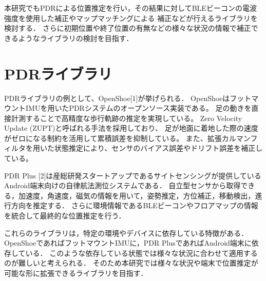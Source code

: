 本研究でもPDRによる位置推定を行い，その結果に対してBLEビーコンの電波強度を使用した補正やマップマッチングによる
補正などが行えるライブラリを検討する．
さらに初期位置や終了位置の有無などの様々な状況の情報で補正できるようなライブラリの検討を目指す．



\section{PDRライブラリ}
PDRライブラリの例として、OpenShoe[1]が挙げられる．
OpenShoeはフットマウントIMUを用いたPDRシステムのオープンソース実装である。
足の動きを直接計測することで高精度な歩行軌跡の推定を実現している。
Zero Velocity Update (ZUPT)と呼ばれる手法を採用しており、
足が地面に着地した際の速度がゼロになる制約を活用して累積誤差を抑制している。
また、拡張カルマンフィルタを用いた状態推定により、センサのバイアス誤差やドリフト誤差を補正している。

PDR Plus [2]は産総研発スタートアップであるサイトセンシングが提供しているAndroid端末向けの自律航法測位システムである．
自立型センサから取得できる，加速度，角速度，磁気の情報を用いて，姿勢推定，方位補正，移動検出，進行方向を推定する．
さらに環境情報であるBLEビーコンやフロアマップの情報を統合して最終的な位置推定を行う．

これらのライブラリは，特定の環境やデバイスに依存している特徴がある．
OpenShoeであればフットマウントIMUに，PDR PlusであればAndroid端末に依存している．
このような依存している状態では様々な状況に合わせて適用するのが難しいと考えられる．
そのため本研究では様々な状況や端末で位置推定が可能な形に拡張できるライブラリを目指す．
